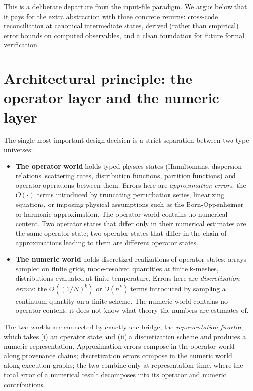 \documentclass[11pt,a4paper]{article}
\newcommand{\abstr}[1]{\textcolor{abstrcol}{#1}}
\newcommand{\numr}[1]{\textcolor{numcol}{#1}}
\begin{document}
This is a deliberate departure from the input-file paradigm. We argue below that it pays for the
extra abstraction with three concrete returns: cross-code reconciliation at canonical intermediate
states, derived (rather than empirical) error bounds on computed observables, and a clean
foundation for future formal verification.

\section{Architectural principle: the operator layer and the numeric layer}
\label{sec:principle}

The single most important design decision is a strict separation between two type universes:

\begin{itemize}[leftmargin=2em]
  \item \abstr{\textbf{The operator world}} holds typed physics states (Hamiltonians, dispersion
        relations, scattering rates, distribution functions, partition functions) and operator
        operations between them. Errors here are \emph{approximation errors}: the $O(\cdot)$
        terms introduced by truncating perturbation series, linearizing equations, or imposing
        physical assumptions such as the Born-Oppenheimer or harmonic approximation. The
        operator world contains no numerical content. Two operator states that differ only in
        their numerical estimates are the same operator state; two operator states that differ
        in the chain of approximations leading to them are different operator states.
  \item \numr{\textbf{The numeric world}} holds discretized realizations of operator states:
        arrays sampled on finite grids, mode-resolved quantities at finite k-meshes,
        distributions evaluated at finite temperature. Errors here are \emph{discretization
        errors}: the $O((1/N)^k)$ or $O(h^k)$ terms introduced by sampling a continuum quantity
        on a finite scheme. The numeric world contains no operator content; it does not know
        what theory the numbers are estimates of.
\end{itemize}

The two worlds are connected by exactly one bridge, the \emph{representation functor}, which
takes (i) an operator state and (ii) a discretization scheme and produces a numeric
representation. Approximation errors compose in the operator world along provenance chains;
discretization errors compose in the numeric world along execution graphs; the two combine only
at representation time, where the total error of a numerical result decomposes into its operator
and numeric contributions.
\end{document}
